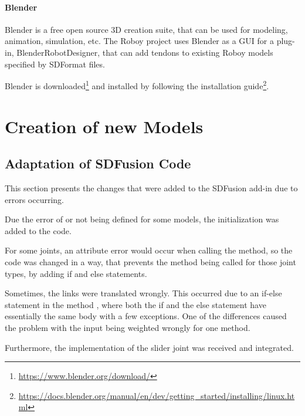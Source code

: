 \subsubsection*{Blender}
Blender is a free open source 3D creation suite, that can be used for modeling, animation, simulation, etc\cite{Blender}. The Roboy project uses Blender as a GUI for a plug-in, BlenderRobotDesigner, that can add tendons to existing Roboy models specified by SDFormat files.

Blender is downloaded\footnote{\url{https://www.blender.org/download/}} and installed by following the installation guide\footnote{\url{https://docs.blender.org/manual/en/dev/getting_started/installing/linux.html}}.

\chapter{Creation of new Models}
\section{Adaptation of SDFusion Code}
\label{sec:code}
This section presents the changes that were added to the SDFusion add-in due to errors occurring.

Due the error of  or  not being defined for some models, the initialization was added to the code.

For some joints, an attribute error would occur when calling the  method, so the code was changed in a way, that prevents the method being called for those joint types, by adding if and else statements. 

Sometimes, the links were translated wrongly. This occurred due to an if-else statement in the method , where both the if and the else statement have essentially the same body with a few exceptions. One of the differences caused the problem with the input being weighted wrongly for one method.

Furthermore, the implementation of the slider joint was received and integrated.

